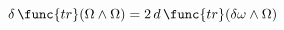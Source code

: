 \begin{equation}
\delta \,\func{tr}(\Omega \wedge \Omega )=2\,d\,\func{tr}(\delta
\omega \wedge \Omega )\,
\end{equation}


